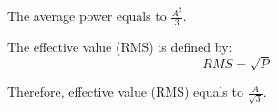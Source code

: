 \begin{task}
The average power equals to $\frac{A^2}{3}$.

The effective value (RMS) is defined by:
\begin{equation}
RMS=\sqrt P
\end{equation}

Therefore, effective value (RMS) equals to $\frac{A}{\sqrt 3}$.
\end{task}